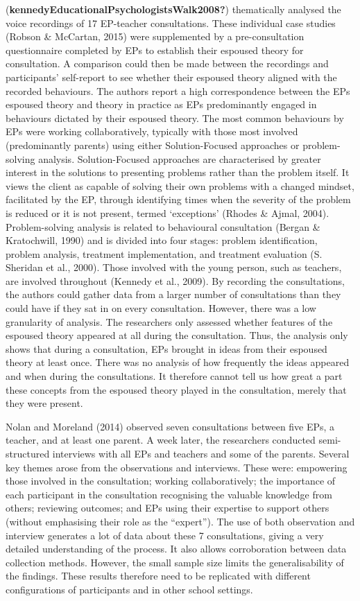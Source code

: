 \documentclass[
  english,
  man]{apa7}
\begin{document}
(\textbf{kennedyEducationalPsychologistsWalk2008?}) thematically analysed the voice recordings of 17 EP-teacher consultations. These individual case studies (Robson \& McCartan, 2015) were supplemented by a pre-consultation questionnaire completed by EPs to establish their espoused theory for consultation. A comparison could then be made between the recordings and participants' self-report to see whether their espoused theory aligned with the recorded behaviours. The authors report a high correspondence between the EPs espoused theory and theory in practice as EPs predominantly engaged in behaviours dictated by their espoused theory. The most common behaviours by EPs were working collaboratively, typically with those most involved (predominantly parents) using either Solution-Focused approaches or problem-solving analysis. Solution-Focused approaches are characterised by greater interest in the solutions to presenting problems rather than the problem itself. It views the client as capable of solving their own problems with a changed mindset, facilitated by the EP, through identifying times when the severity of the problem is reduced or it is not present, termed `exceptions' (Rhodes \& Ajmal, 2004). Problem-solving analysis is related to behavioural consultation (Bergan \& Kratochwill, 1990) and is divided into four stages: problem identification, problem analysis, treatment implementation, and treatment evaluation (S. Sheridan et al., 2000). Those involved with the young person, such as teachers, are involved throughout (Kennedy et al., 2009). By recording the consultations, the authors could gather data from a larger number of consultations than they could have if they sat in on every consultation. However, there was a low granularity of analysis. The researchers only assessed whether features of the espoused theory appeared at all during the consultation. Thus, the analysis only shows that during a consultation, EPs brought in ideas from their espoused theory at least once. There was no analysis of how frequently the ideas appeared and when during the consultations. It therefore cannot tell us how great a part these concepts from the espoused theory played in the consultation, merely that they were present.

Nolan and Moreland (2014) observed seven consultations between five EPs, a teacher, and at least one parent. A week later, the researchers conducted semi-structured interviews with all EPs and teachers and some of the parents. Several key themes arose from the observations and interviews. These were: empowering those involved in the consultation; working collaboratively; the importance of each participant in the consultation recognising the valuable knowledge from others; reviewing outcomes; and EPs using their expertise to support others (without emphasising their role as the ``expert''). The use of both observation and interview generates a lot of data about these 7 consultations, giving a very detailed understanding of the process. It also allows corroboration between data collection methods. However, the small sample size limits the generalisability of the findings. These results therefore need to be replicated with different configurations of participants and in other school settings.
\end{document}
